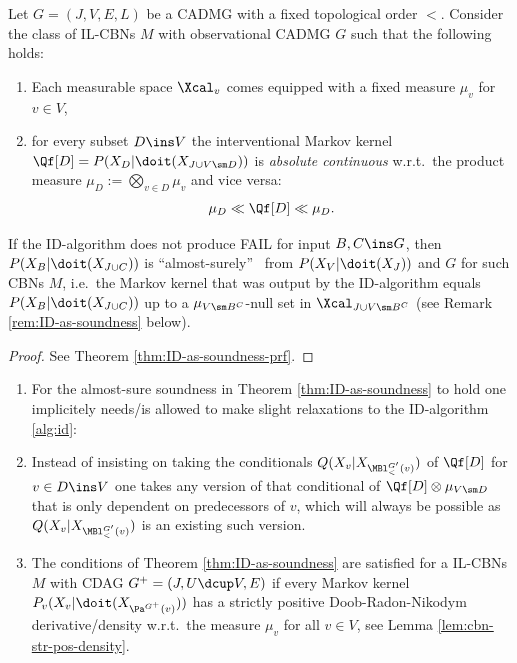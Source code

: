\begin{Thm}
    \label{thm:ID-as-soundness}
    Let $G=(J,V,E,L)$ be a CADMG with a fixed topological order $<$. 
    Consider the class of IL-CBNs $M$ with observational CADMG $G$ such that the following holds: 
    \begin{enumerate}
        \item Each measurable space $\Xcal_v$ comes equipped with a fixed measure $\mu_v$ for $v \in V$,
        \item for every subset $D \ins V$ the interventional Markov kernel $\Qf[D]=P(X_D|\doit(X_{J \cup V \sm D}))$ is
            \emph{absolute continuous} w.r.t.\ the product measure $\mu_D:=\bigotimes_{v \in D} \mu_v$ and vice versa:
            \[ \mu_D \ll \Qf[D] \ll \mu_D.   \]
    \end{enumerate}
    If the ID-algorithm does not produce FAIL for input $B, C \ins G$,
    then $P(X_B|\doit(X_{J \cup C}))$ is ``almost-surely'' \trackable\ from $P(X_V|\doit(X_J))$ and $G$ for such CBNs $M$, 
    i.e.\ the Markov kernel that was output by the ID-algorithm equals $P(X_B|\doit(X_{J \cup C}))$ up to a
    $\mu_{V\sm B^C}$-null set in $\Xcal_{J \cup V\sm B^C}$ (see Remark \ref{rem:ID-as-soundness} below).
    \begin{proof}
        See Theorem \ref{thm:ID-as-soundness-prf}.
    \end{proof}
\end{Thm}

\begin{Rem}
    \label{rem:ID-as-soundness}
    \begin{enumerate}
        \item For the almost-sure soundness in Theorem \ref{thm:ID-as-soundness} to hold one implicitely needs/is allowed
            to make slight relaxations to the ID-algorithm \ref{alg:id}: 
        \item[] Instead of insisting on taking the conditionals $Q(X_v|X_{\MBl^{G'}_<(v)})$ 
            of $\Qf[D]$ for $v \in D \ins V$ one takes any version of that conditional of $\Qf[D]\otimes \mu_{V \sm D}$ 
            that is only dependent on predecessors of $v$, 
            which will always be possible as $Q(X_v|X_{\MBl^{G'}_<(v)})$ is an existing such version.
        \item The conditions of Theorem \ref{thm:ID-as-soundness} are satisfied for a IL-CBNs $M$ with CDAG
            $G^+=(J, U \dcup V,E)$ if every Markov kernel $P_v(X_v|\doit(X_{\Pa^{G^+}(v)}))$ has a strictly positive Doob-Radon-Nikodym derivative/density w.r.t.\ the measure $\mu_v$ for all $v \in V$, see Lemma \ref{lem:cbn-str-pos-density}.
    \end{enumerate}
\end{Rem}

